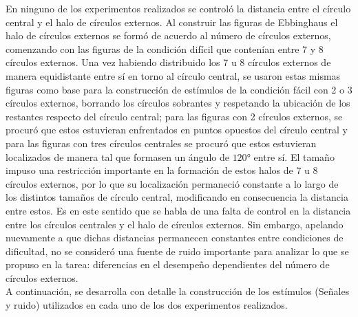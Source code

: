 En ninguno de los experimentos realizados se controló la distancia entre el círculo central y el halo de círculos externos. Al construir las figuras de Ebbinghaus el halo de círculos externos se formó de acuerdo al número de círculos externos, comenzando con las figuras de la condición difícil que contenían entre 7 y 8 círculos externos. Una vez habiendo distribuido los 7 u 8 círculos externos de manera equidistante entre sí en torno al círculo central, se usaron estas mismas figuras como base para la construcción de estímulos de la condición fácil con 2 o 3 círculos externos, borrando los círculos sobrantes y respetando la ubicación de los restantes respecto del círculo central; para las figuras con 2 círculos externos, se procuró que estos estuvieran enfrentados en puntos opuestos del círculo central y para las figuras con tres círculos centrales se procuró que estos estuvieran localizados de manera tal que formasen un ángulo de $120°$ entre sí. El tamaño impuso una restricción importante en la formación de estos halos de 7 u 8 círculos externos, por lo que su localización permaneció constante a lo largo de los distintos tamaños de círculo central, modificando en consecuencia la distancia entre estos. Es en este sentido que se habla de una falta de control en la distancia entre los círculos centrales y el halo de círculos externos. Sin embargo, apelando nuevamente a que dichas distancias permanecen constantes entre condiciones de dificultad, no se consideró una fuente de ruido importante para analizar lo que se propuso en la tarea: diferencias en el desempeño dependientes del número de círculos externos.\\

A continuación, se desarrolla con detalle la construcción de los estímulos (Señales y ruido) utilizados en cada uno de los dos experimentos realizados.\\

